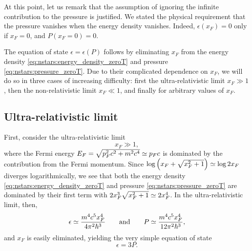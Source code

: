 At this point, let us remark that the assumption of ignoring the infinite contribution to the pressure is justified.
We stated the physical requirement that the pressure vanishes when the energy density vanishes.
Indeed, $\epsilon(x_F) = 0$ only if $x_F = 0$, and $P(x_F=0) = 0$.

The equation of state $\epsilon = \epsilon(P)$ follows by eliminating $x_F$ from the energy density \eqref{eq:nstars:energy_density_zeroT} and pressure \eqref{eq:nstars:pressure_zeroT}.
Due to their complicated dependence on $x_F$, we will do so in three cases of increasing difficulty: first the ultra-relativistic limit $x_F \gg 1$, then the non-relativistic limit $x_F \ll 1$, and finally for arbitrary values of $x_F$.

\subsection{Ultra-relativistic limit}
\label{sec:nstars:ur_limit}

First, consider the ultra-relativistic limit
\begin{equation}
	x_F \gg 1 , 
\label{eq:nstars:ur_limit}
\end{equation}
where the Fermi energy $E_F = \sqrt{p_F^2 c^2 + m^2 c^4} \simeq p_F c$ is dominated by the contribution from the Fermi momentum.
Since $\log \left( x_F + \sqrt{x_F^2 + 1} \right) \simeq \log 2 x_F$ diverges logarithmically, we see that both the energy density \eqref{eq:nstars:energy_density_zeroT} and pressure \eqref{eq:nstars:pressure_zeroT} are dominated by their first term with $2 x_F^3 \sqrt{x_F^2 + 1} \simeq 2 x_F^4$.
In the ultra-relativistic limit, then,
\begin{equation}
	\epsilon \simeq \frac{m^4 c^5 x_F^4}{4 \pi^2 \hbar^3}
	\qquad \text{and} \qquad
	P        \simeq \frac{m^4 c^5 x_F^4}{12 \pi^2 \hbar^3},
\end{equation}
and $x_F$ is easily eliminated, yielding the very simple equation of state
\begin{equation}
	\epsilon = 3 P .
\label{eq:nstars:ur_eos}
\end{equation}

